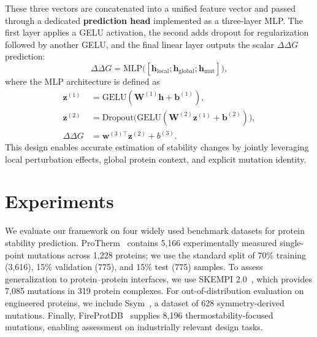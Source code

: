 \documentclass[11pt]{article}
\begin{document}
These three vectors are concatenated into a unified feature vector and passed through a dedicated \textbf{prediction head} implemented as a three-layer MLP. The first layer applies a GELU activation, the second adds dropout for regularization followed by another GELU, and the final linear layer outputs the scalar $\Delta\Delta G$ prediction:
\begin{equation}
    \Delta \Delta G = \text{MLP}\big([\mathbf{h}_{\text{local}}; \mathbf{h}_{\text{global}}; \mathbf{h}_{\text{mut}}]\big),
\end{equation}
where the MLP architecture is defined as
\begin{align}
    \mathbf{z}^{(1)} &= \text{GELU}(\mathbf{W}^{(1)} \mathbf{h} + \mathbf{b}^{(1)}), \\
    \mathbf{z}^{(2)} &= \text{Dropout}\big(\text{GELU}(\mathbf{W}^{(2)} \mathbf{z}^{(1)} + \mathbf{b}^{(2)})\big), \\
    \Delta \Delta G &= \mathbf{w}^{(3)\top} \mathbf{z}^{(2)} + b^{(3)}.
\end{align}
This design enables accurate estimation of stability changes by jointly
leveraging local perturbation effects, global protein context, and explicit
mutation identity.





\section{Experiments}
\label{sec:experiments}


We evaluate our framework on four widely used benchmark datasets for protein
stability prediction. ProTherm~\cite{kumar2006protherm} contains 5,166
experimentally measured single-point mutations across 1,228 proteins; we use
the standard split of 70\% training (3,616), 15\% validation (775), and 15\% test
(775) samples. To assess generalization to protein–protein interfaces, we use
SKEMPI 2.0~\cite{jankauskaite2019skempi}, which provides 7,085 mutations in
319 protein complexes. For out-of-distribution evaluation on engineered
proteins, we include Ssym~\cite{kellogg2011role}, a dataset of 628
symmetry-derived mutations. Finally, FireProtDB~\cite{stourac2021fireprotdb}
supplies 8,196 thermostability-focused mutations, enabling assessment on
industrially relevant design tasks.
\end{document}
